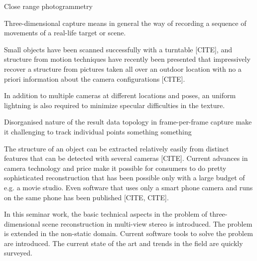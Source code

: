Close range photogrammetry

Three-dimensional capture means in general the way of recording a sequence of movements of a real-life target or scene.

Small objects have been scanned successfully with a turntable [CITE], and structure from motion techniques have recently been presented that impressively recover a structure from pictures taken all over an outdoor location with no a priori information about the camera configurations [CITE].

In addition to multiple cameras at different locations and poses, an uniform lightning is also required to minimize specular difficulties in the texture.

Disorganised nature of the result data topology in frame-per-frame capture make it challenging to track individual points something something

The structure of an object can be extracted relatively easily from distinct features that can be detected with several cameras [CITE].
Current advances in camera technology and price make it possible for consumers to do pretty sophisticated reconstruction that has been possible only with a large budget of e.g. a movie studio.
Even software that uses only a smart phone camera and runs on the same phone has been published [CITE, CITE].

In this seminar work, the basic technical aspects in the problem of three-dimensional scene reconstruction in multi-view stereo is introduced. The problem is extended in the non-static domain. Current software tools to solve the problem are introduced. The current state of the art and trends in the field are quickly surveyed.
